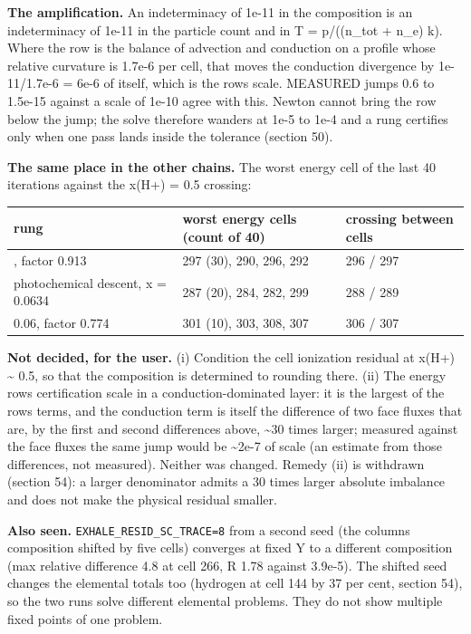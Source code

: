 \documentclass[english,a4paper]{my_memo}
\begin{document}
\textbf{The amplification.} An indeterminacy of 1e-11 in the composition is an
indeterminacy of 1e-11 in the particle count and in T = p/((n\_tot + n\_e) k).
Where the row is the balance of advection and conduction on a profile whose
relative curvature is 1.7e-6 per cell, that moves the conduction divergence
by 1e-11/1.7e-6 = 6e-6 of itself, which is the row\textquotesingle s scale. MEASURED jumps
0.6 to 1.5e-15 against a scale of 1e-10 agree with this. Newton cannot
bring the row below the jump; the solve therefore wanders at 1e-5 to 1e-4
and a rung certifies only when one pass lands inside the tolerance
(section 50).

\textbf{The same place in the other chains.} The worst energy cell of the last
40 iterations against the x(H+) = 0.5 crossing:

{\def\LTcaptype{none} %
{\small
\begin{longtable}[]{@{}lll@{}}
\toprule\noalign{}
rung & worst energy cells (count of 40) & crossing between cells \\
\midrule\noalign{}
\endhead
\bottomrule\noalign{}
\endlastfoot
0.0624, factor 0.913 & 297 (30), 290, 296, 292 & 296 / 297 \\
photochemical descent, x = 0.0634 & 287 (20), 284, 282, 299 & 288 / 289 \\
0.06, factor 0.774 & 301 (10), 303, 308, 307 & 306 / 307 \\
\end{longtable}
}
}

\textbf{Not decided, for the user.} (i) Condition the cell ionization
residual at x(H+) \textasciitilde{} 0.5, so that the composition is determined to rounding
there. (ii) The energy row\textquotesingle s certification scale in a conduction-dominated
layer: it is the largest of the row\textquotesingle s terms, and the conduction term is
itself the difference of two face fluxes that are, by the first and second
differences above, \textasciitilde30 times larger; measured against the face fluxes the
same jump would be \textasciitilde2e-7 of scale (an estimate from those differences, not
measured). Neither was changed. Remedy (ii) is withdrawn (section 54): a
larger denominator admits a 30 times larger absolute imbalance and does not
make the physical residual smaller.

\textbf{Also seen.} \texttt{EXHALE\_RESID\_SC\_TRACE=8} from a second seed (the column\textquotesingle s
composition shifted by five cells) converges at fixed Y to a different
composition (max relative difference 4.8 at cell 266, \textbar\textbar R\textbar\textbar{} 1.78 against
3.9e-5). The shifted seed changes the elemental totals too (hydrogen at
cell 144 by 37 per cent, section 54), so the two runs solve different
elemental problems. They do not show multiple fixed points of one
problem.
\end{document}
